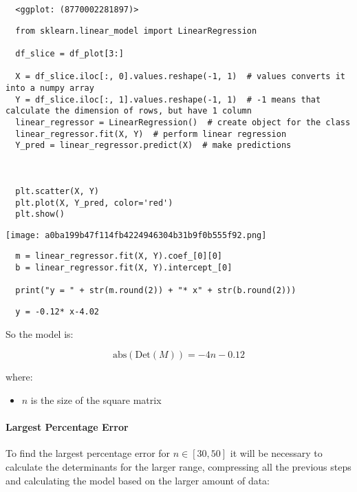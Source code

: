 \documentclass[11pt]{article}
\begin{document}
\begin{verbatim}
  <ggplot: (8770002281897)>
\end{verbatim}

\begin{verbatim}
  from sklearn.linear_model import LinearRegression

  df_slice = df_plot[3:]

  X = df_slice.iloc[:, 0].values.reshape(-1, 1)  # values converts it into a numpy array
  Y = df_slice.iloc[:, 1].values.reshape(-1, 1)  # -1 means that calculate the dimension of rows, but have 1 column
  linear_regressor = LinearRegression()  # create object for the class
  linear_regressor.fit(X, Y)  # perform linear regression
  Y_pred = linear_regressor.predict(X)  # make predictions



  plt.scatter(X, Y)
  plt.plot(X, Y_pred, color='red')
  plt.show()
\end{verbatim}

\begin{center}
\texttt{[image: a0ba199b47f114fb4224946304b31b9f0b555f92.png]}
\end{center}

\begin{verbatim}
  m = linear_regressor.fit(X, Y).coef_[0][0]
  b = linear_regressor.fit(X, Y).intercept_[0]

  print("y = " + str(m.round(2)) + "* x" + str(b.round(2)))
\end{verbatim}

\begin{verbatim}
  y = -0.12* x-4.02
\end{verbatim}

So the model is:

$$
\text{abs}(\text{Det}(M)) = -4n - 0.12
$$

where:

\begin{itemize}
\item \(n\) is the size of the square matrix
\end{itemize}

\paragraph{Largest Percentage Error}
\label{largest-percentage-error}
To find the largest percentage error for \(n \in [30, 50]\) it will be
necessary to calculate the determinants for the larger range,
compressing all the previous steps and calculating the model based on
the larger amount of data:
\end{document}
